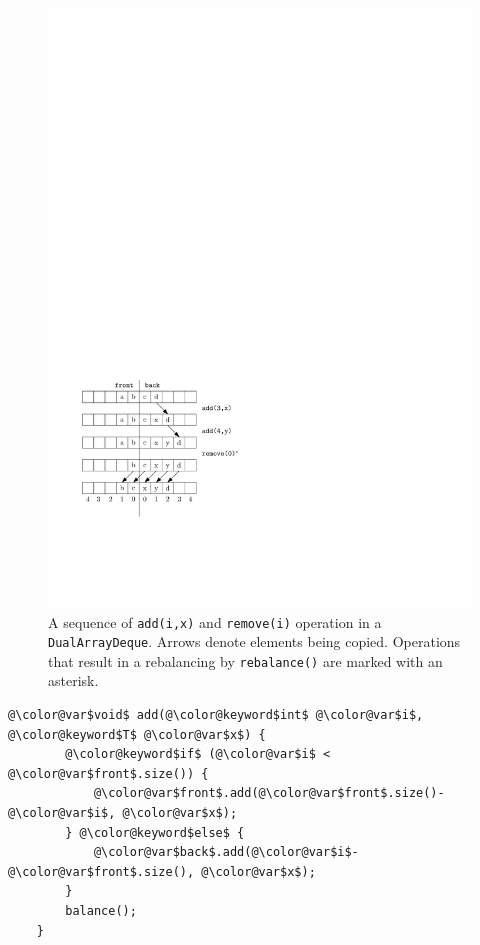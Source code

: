 \begin{figure}
  \begin{center}
    \includegraphics{figs/dualarraydeque}
  \end{center}
  \caption{A sequence of \mbox{\texttt{add({\color{var}i},{\color{var}x})}} and \mbox{\texttt{remove({\color{var}i})}} operation in a
  \mbox{\texttt{DualArrayDeque}}.  Arrows denote elements being copied.
  Operations that result in a rebalancing by \mbox{\texttt{rebalance()}} are marked with an asterisk.}
\end{figure}



\begin{Verbatim}[tabsize=2,frame=single,commandchars=\\@\$,label=\texttt{DualArrayDeque},labelposition=topline]
	@\color@var$void$ add(@\color@keyword$int$ @\color@var$i$, @\color@keyword$T$ @\color@var$x$) {
		@\color@keyword$if$ (@\color@var$i$ < @\color@var$front$.size()) { 
			@\color@var$front$.add(@\color@var$front$.size()-@\color@var$i$, @\color@var$x$);
		} @\color@keyword$else$ {
			@\color@var$back$.add(@\color@var$i$-@\color@var$front$.size(), @\color@var$x$);
		}
		balance();
	}
\end{Verbatim}

